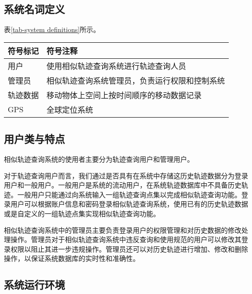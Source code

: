 \subsection{系统名词定义}
\label{subsec:definitions}
表\ref{tab-system definitions}所示。
\begin{table}[!htpb]
  	\centering
		\begin{tabular}{ |p{3cm}||p{9cm}|  }
		\hline
		符号标记 & 符号注释 \\
		\hline
		用户 & 使用相似轨迹查询系统进行轨迹查询人员 \\
		\hline
		管理员 & 相似轨迹查询系统管理员，负责运行权限和控制系统 \\
		\hline
		轨迹数据 & 移动物体上空间上按时间顺序的移动数据记录 \\
		\hline
		GPS & 全球定位系统 \\
		\hline
		\end{tabular}
\end{table}

\subsection{用户类与特点}
\label{subsec:user characteristics}
相似轨迹查询系统的使用者主要分为轨迹查询用户和管理用户。

对于轨迹查询用户而言，我们通过是否具有在系统中存储这历史轨迹数据分为登录用户和一般用户。一般用户是系统的流动用户，在系统轨迹数据库中不具备历史轨迹。一般用户只能通过向系统输入一组轨迹查询点集以完成相似轨迹查询功能。登录用户可以根据账户信息和密码登录相似轨迹查询系统，使用已有的历史轨迹数据或是自定义的一组轨迹点集实现相似轨迹查询功能。

相似轨迹查询系统中的管理员主要负责登录用户的权限管理和对历史数据的修改处理操作。管理员对于相似轨迹查询系统中违反查询和使用规范的用户可以修改其登录权限以阻止其进一步违规操作。管理员还可以对历史轨迹进行增加、修改和删除操作，以保证系统数据库的实时性和准确性。

\subsection{系统运行环境}
\label{subsec:system environment}

